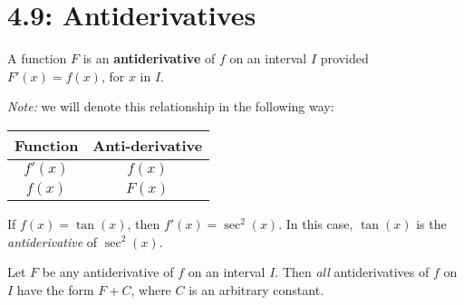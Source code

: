 \documentclass[../mathNotesPreamble]{subfiles}
\begin{document}
\section{4.9: Antiderivatives}
  \begin{defn*}[Antiderivative]
    A function $F$ is an \textbf{antiderivative} of $f$ on an interval $I$ provided $F'(x)=f(x)$, for $x$ in $I$.
  \end{defn*}
  \begin{center}
    \textit{Note:} we will denote this relationship in the following way:
    
    \begin{tabular}{@{}cc@{}}\toprule
      Function& Anti-derivative\\\midrule
      $f'(x)$& $f(x)$\\
      $f(x)$& $F(x)$\\\bottomrule
    \end{tabular}
  \end{center}
  
  \begin{ex*}
    If $f(x)=\tan(x)$, then $f'(x)=\sec^2(x)$. In this case, $\tan(x)$ is the \textit{antiderivative} of $\sec^2(x)$.
  \end{ex*}

  \begin{thmBox*}
    Let $F$ be any antiderivative of $f$ on an interval $I$. Then \textit{all} antiderivatives of $f$ on $I$ have the form $F+C$, where $C$ is an arbitrary constant.
  \end{thmBox*}
  
\end{document}
